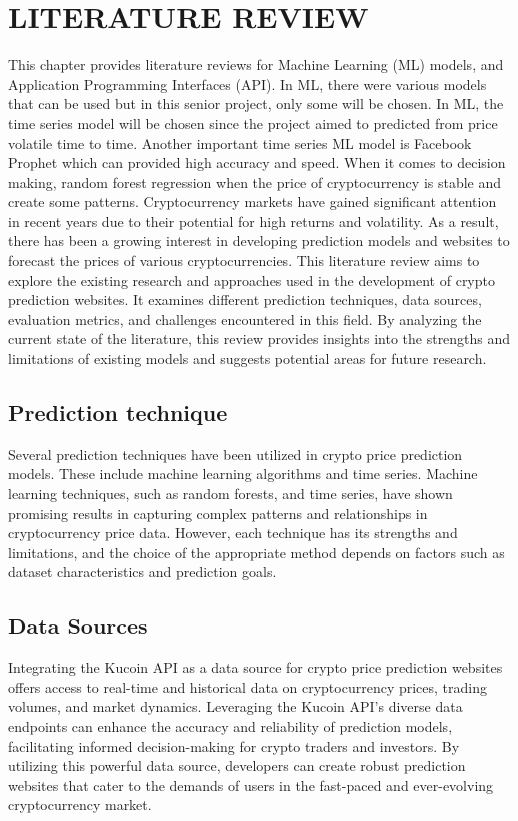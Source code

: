 \chapter{LITERATURE REVIEW}


This chapter provides literature reviews for Machine Learning (ML) models, and Application Programming Interfaces (API). In ML, there were various models that can be used but in this senior project, only some will be chosen. In ML, the time series model will be chosen since the project aimed to predicted from price volatile time to time. Another important time series ML model is Facebook Prophet which can provided high accuracy and speed. When it comes to decision making, random forest regression when the price of cryptocurrency is stable and create some patterns. Cryptocurrency markets have gained significant attention in recent years due to their potential for high returns and volatility. As a result, there has been a growing interest in developing prediction models and websites to forecast the prices of various cryptocurrencies. This literature review aims to explore the existing research and approaches used in the development of crypto prediction websites. It examines different prediction techniques, data sources, evaluation metrics, and challenges encountered in this field. By analyzing the current state of the literature, this review provides insights into the strengths and limitations of existing models and suggests potential areas for future research.\cite{cryptoMarket}

\setcounter{chapter}{2}

\section{Prediction technique}
Several prediction techniques have been utilized in crypto price prediction models. These include machine learning algorithms and time series. Machine learning techniques, such as random forests, and time series, have shown promising results in capturing complex patterns and relationships in cryptocurrency price data. However, each technique has its strengths and limitations, and the choice of the appropriate method depends on factors such as dataset characteristics and prediction goals.\cite{patternRecognition}

\section{Data Sources}
Integrating the Kucoin API as a data source for crypto price prediction websites offers access to real-time and historical data on cryptocurrency prices, trading volumes, and market dynamics. Leveraging the Kucoin API's diverse data endpoints can enhance the accuracy and reliability of prediction models, facilitating informed decision-making for crypto traders and investors. By utilizing this powerful data source, developers can create robust prediction websites that cater to the demands of users in the fast-paced and ever-evolving cryptocurrency market.\cite{kucoinAPI}

